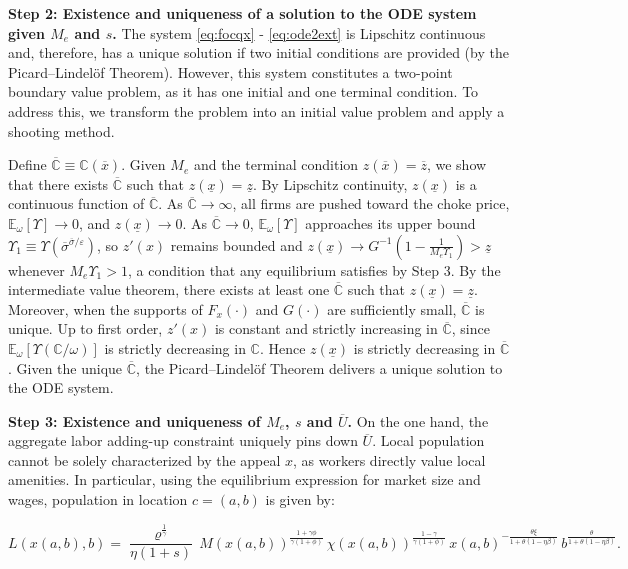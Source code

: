 \textbf{Step 2: Existence and uniqueness of a solution to the ODE system given $M_e$ and $s$.} The system \eqref{eq:focqx} - \eqref{eq:ode2ext} is Lipschitz continuous and, therefore, has a unique solution if two initial conditions are provided (by the Picard–Lindel\"{o}f Theorem). However, this system constitutes a two-point boundary value problem, as it has one initial and one terminal condition. To address this, we transform the problem into an initial value problem and apply a shooting method.

Define $\overline{\mathbb{C}} \equiv \mathbb{C}(\overline{x})$. Given $M_e$ and the terminal condition $z(\overline{x}) = \overline{z}$, we show that there exists $\overline{\mathbb{C}}$ such that $z(\underline{x}) = \underline{z}$. By Lipschitz continuity, $z(\underline{x})$ is a continuous function of $\overline{\mathbb{C}}$. As $\overline{\mathbb{C}} \to \infty$, all firms are pushed toward the choke price, $\mathbb{E}_{\omega}[\Upsilon] \to 0$, and $z(\underline{x}) \to 0$. As $\overline{\mathbb{C}} \to 0$, $\mathbb{E}_{\omega}[\Upsilon]$ approaches its upper bound $\Upsilon_1 \equiv \Upsilon\left(\overline{\sigma}^{\overline{\sigma}/\varepsilon}\right)$, so $z'(x)$ remains bounded and $z(\underline{x}) \to G^{-1}\left(1 - \frac{1}{M_e \Upsilon_1}\right) > \underline{z}$ whenever $M_e \Upsilon_1 > 1$, a condition that any equilibrium satisfies by Step 3. By the intermediate value theorem, there exists at least one $\overline{\mathbb{C}}$ such that $z(\underline{x}) = \underline{z}$. Moreover, when the supports of $F_x(\cdot)$ and $G(\cdot)$ are sufficiently small, $\overline{\mathbb{C}}$ is unique. Up to first order, $z'(x)$ is constant and strictly increasing in $\overline{\mathbb{C}}$, since $\mathbb{E}_{\omega}[\Upsilon(\mathbb{C}/\omega)]$ is strictly decreasing in $\mathbb{C}$. Hence $z(\underline{x})$ is strictly decreasing in $\overline{\mathbb{C}}$. Given the unique $\overline{\mathbb{C}}$, the Picard–Lindel\"{o}f Theorem delivers a unique solution to the ODE system.

\textbf{Step 3: Existence and uniqueness of $M_e$, $s$ and $\overline{U}$.} On the one hand, the aggregate labor adding-up constraint uniquely pins down $\overline{U}$. Local population cannot be solely characterized by the appeal $x$, as workers directly value local amenities. In particular, using the equilibrium expression for market size and wages, population in location $c = (a,b)$ is given by:

\begin{equation*}
	L\left(x(a,b), b\right) = \frac{\varrho^{\frac{1}{\gamma}}}{\eta (1+s)}\, M\left(x(a,b)\right)^{\frac{1+\gamma\phi}{\gamma(1+\phi)}}\, \chi\left(x(a,b)\right)^{\frac{1-\gamma}{\gamma(1+\phi)}}\, x(a,b)^{-\frac{\theta\xi}{1 + \theta(1-\eta \beta)}}\, b^{\frac{\theta}{1 + \theta(1-\eta \beta)}}.
\end{equation*}

